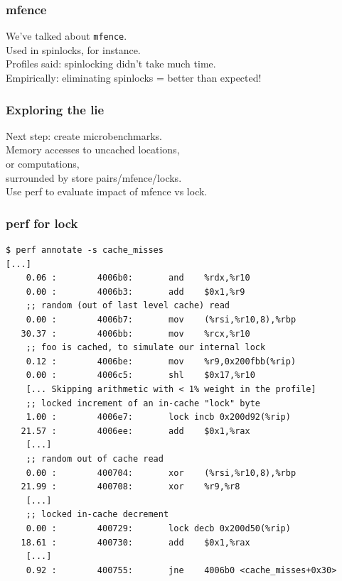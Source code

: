 \begin{frame}
  \frametitle{mfence}


    We've talked about {\tt mfence}.\\
    Used in spinlocks, for instance.\\[2em]
    Profiles said: spinlocking didn't take much time.\\
    Empirically: eliminating spinlocks = better than expected!
    
  
  
\end{frame}

\begin{frame}
  \frametitle{Exploring the lie}

  
    Next step: create microbenchmarks.\\[1em]
    Memory accesses to uncached locations,\\
    or computations,\\[1em]
    surrounded by store pairs/mfence/locks.\\[1em]
    Use perf to evaluate impact of mfence vs lock.
  

\end{frame}

\begin{frame}[fragile]
  \frametitle{perf for lock}

    \begin{lstlisting}
$ perf annotate -s cache_misses
[...]
    0.06 :        4006b0:       and    %rdx,%r10
    0.00 :        4006b3:       add    $0x1,%r9
    ;; random (out of last level cache) read
    0.00 :        4006b7:       mov    (%rsi,%r10,8),%rbp
   30.37 :        4006bb:       mov    %rcx,%r10
    ;; foo is cached, to simulate our internal lock
    0.12 :        4006be:       mov    %r9,0x200fbb(%rip)
    0.00 :        4006c5:       shl    $0x17,%r10
    [... Skipping arithmetic with < 1% weight in the profile]
    ;; locked increment of an in-cache "lock" byte
    1.00 :        4006e7:       lock incb 0x200d92(%rip)
   21.57 :        4006ee:       add    $0x1,%rax
    [...]
    ;; random out of cache read
    0.00 :        400704:       xor    (%rsi,%r10,8),%rbp
   21.99 :        400708:       xor    %r9,%r8
    [...]
    ;; locked in-cache decrement
    0.00 :        400729:       lock decb 0x200d50(%rip)
   18.61 :        400730:       add    $0x1,%rax
    [...]
    0.92 :        400755:       jne    4006b0 <cache_misses+0x30>
    \end{lstlisting}


\end{frame}


